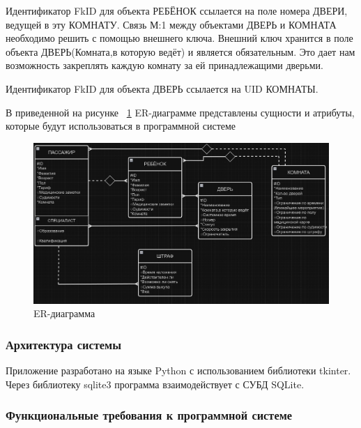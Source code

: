 Идентификатор FkID для объекта РЕБЁНОК ссылается на поле номера ДВЕРИ, ведущей в эту КОМНАТУ.
Связь М:1 между объектами ДВЕРЬ и КОМНАТА необходимо решить с помощью внешнего ключа. 
Внешний ключ хранится в поле объекта ДВЕРЬ(Комната,в которую ведёт) и является обязательным. Это дает нам возможность закреплять каждую комнату за ей принадлежащими дверьми.
 
Идентификатор FkID для объекта ДВЕРЬ ссылается на UID  КОМНАТЫ.

В приведенной на рисунке ~\ref{fig:er} ER-диаграмме представлены сущности и атрибуты, которые будут использоваться в программной системе 

\begin{figure}[ht]
	\centering
	\includegraphics[width=1\linewidth]{images/ER}
	\caption{ER-диаграмма}
	\label{fig:er}
\end{figure}


\subsubsection{Архитектура системы}

Приложение разработано на языке Python с использованием библиотеки tkinter. Через библиотеку sqlite3 программа взаимодействует с СУБД SQLite.

\subsubsection{Функциональные требования к программной системе}

